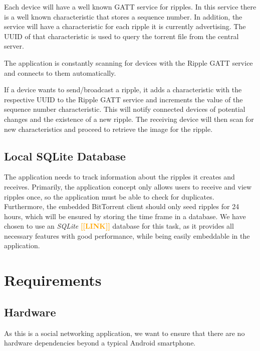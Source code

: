 \documentclass{report}
\newcommand{\todo}[1]{\textsf{\textbf{\textcolor{orange}{[[#1]]}}}}
\begin{document}
Each device will have a well known GATT service for ripples. In this service there is a well known characteristic that stores a sequence number. In addition, the service will have a characteristic for each ripple it is currently advertising. The UUID of that characteristic is used to query the torrent file from the central server.

The application is constantly scanning for devices with the Ripple GATT service and connects to them automatically.

If a device wants to send/broadcast a ripple, it adds a characteristic with the respective UUID to the Ripple GATT service and increments the value of the sequence number characteristic. This will notify connected devices of potential changes and the existence of a new ripple. The receiving device will then scan for new characteristics and proceed to retrieve the image for the ripple.

\subsection{Local SQLite Database}
The application needs to track information about the ripples it creates and receives. Primarily, the application concept only allows users to receive and view ripples once, so the application must be able to check for duplicates. Furthermore, the embedded BitTorrent client should only seed ripples for 24 hours, which will be ensured by storing the time frame in a database.
We have chosen to use an \textit{SQLite} \todo{LINK} database for this task, as it provides all necessary features with good performance, while being easily embeddable in the application.

\section{Requirements}

\subsection{Hardware}
As this is a social networking application, we want to ensure that there are no hardware dependencies beyond a typical Android smartphone.
\end{document}
